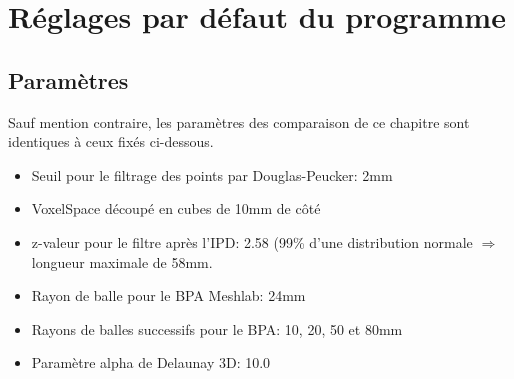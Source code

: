 \documentclass[a4paper,10pt]{report}
\begin{document}
\section{Réglages par défaut du programme}
\subsection{Paramètres}
Sauf mention contraire, les paramètres des comparaison de ce chapitre sont identiques à ceux fixés ci-dessous.

\begin{itemize}
	 \item Seuil pour le filtrage des points par Douglas-Peucker: 2mm
    \item VoxelSpace découpé en cubes de 10mm de côté
    \item z-valeur pour le filtre après l'IPD: 2.58 (99\% d'une distribution normale $\Rightarrow$ longueur maximale de 58mm.
    \item Rayon de balle pour le BPA Meshlab: 24mm
    \item Rayons de balles successifs pour le BPA: 10, 20, 50 et 80mm
    \item Paramètre alpha de Delaunay 3D: 10.0
\end{itemize}
\end{document}

